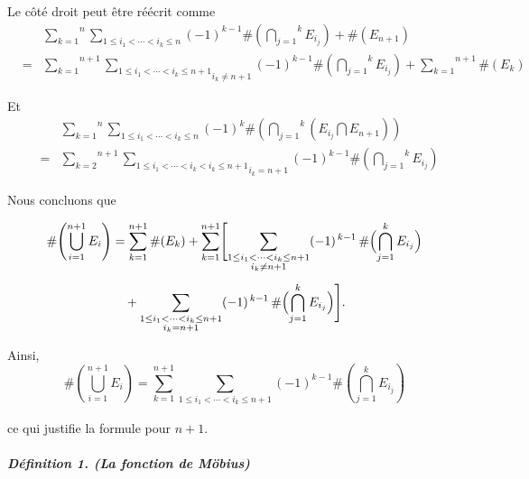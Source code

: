 Le c{\^o}t{\'e} droit peut {\^e}tre r{\'e}{\'e}crit comme
\begin{eqnarray*}
  &  & \overset{n}{\underset{k = 1}{\sum}} \underset{1 \leqslant i_1 < \cdots
  < i_k \leqslant n}{\sum} (- 1)^{k - 1} \# \left( \overset{k}{\underset{j =
  1}{\bigcap}} E_{i_j} \right) +\# (E_{n + 1})\\
  & = & \overset{n + 1}{\underset{k = 1}{\sum}} \underset{i_k \neq n +
  1}{\underset{1 \leqslant i_1 < \cdots < i_k \leqslant n + 1}{\sum}} (- 1)^{k
  - 1} \# \left( \overset{k}{\underset{j = 1}{\bigcap}} E_{i_j} \right) +
  \overset{n + 1}{\underset{k = 1}{\sum}} \# (E_k)
\end{eqnarray*}


Et
\begin{eqnarray*}
  &  & \overset{n}{\underset{k = 1}{\sum}} \underset{1 \leqslant i_1 < \cdots
  < i_k \leqslant n}{\sum} (- 1)^k \# \left( \overset{k}{\underset{j =
  1}{\bigcap}} \left( E_{i_j} \bigcap E_{n + 1} \right) \right)\\
  & = & \overset{n + 1}{\underset{k = 2}{\sum}} \underset{i_k = n +
  1}{\underset{1 \leqslant i_1 < \cdots < i_k < i_k \leqslant n + 1}{\sum}} (-
  1)^{k - 1} \# \left( \overset{k}{\underset{j = 1}{\bigcap}} E_{i_j} \right)
\end{eqnarray*}


Nous concluons que


\[
\begin{aligned}
\#\Biggl(\bigcup_{i=1}^{n+1} E_i\Biggr)
&= \sum_{k=1}^{n+1} \#(E_k)
+ \sum_{k=1}^{n+1} \Biggl[
\sum_{\substack{1\le i_1<\cdots<i_k\le n+1 \\ i_k\neq n+1}} (-1)^{\,k-1}\,\#\Bigl(\bigcap_{j=1}^k E_{i_j}\Bigr)\\[1ex]
&\quad + \sum_{\substack{1\le i_1<\cdots<i_k\le n+1 \\ i_k = n+1}} (-1)^{\,k-1}\,\#\Bigl(\bigcap_{j=1}^k E_{i_j}\Bigr)
\Biggr].
\end{aligned}
\]



Ainsi,
\[ \# \left( \underset{i = 1}{\overset{n + 1}{\bigcup}} E_i \right) =
   \underset{}{\overset{n + 1}{\underset{k = 1}{\sum}} \underset{1 \leqslant
   i_1 < \cdots < i_k \leqslant n + 1}{\sum} (- 1)^{k - 1} \# \left(
   \overset{k}{\underset{j = 1}{\bigcap}} E_{i_j} \right)} \]


ce qui justifie la formule pour $n + 1$.

\subparagraph{D{\'e}finition 1. (La fonction de M{\"o}bius)}

